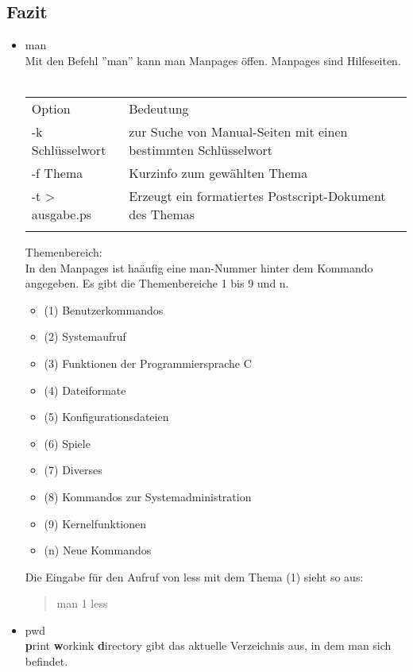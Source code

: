 	\subsection{Fazit}
		\begin{itemize}
			\item man\\
			Mit den Befehl ''man'' kann man Manpages \"offen. Manpages sind Hilfeseiten.\\ \\
			\begin{tabular}{ll}
				Option & Bedeutung \\
				-k Schl\"usselwort & zur Suche von Manual-Seiten mit einen bestimmten Schl\"usselwort \\
				-f Thema & Kurzinfo zum gew\"ahlten Thema \\
				-t > ausgabe.ps & Erzeugt ein formatiertes Postscript-Dokument des Themas\\ \\
			\end{tabular}
			Themenbereich:\\
			In den Manpages ist ha\"aufig eine man-Nummer hinter dem Kommando angegeben. Es gibt die Themenbereiche 1 bis 9 und n.
			\begin{itemize}
				\item (1) Benutzerkommandos
				\item (2) Systemaufruf
				\item (3) Funktionen der Programmiersprache C
				\item (4) Dateiformate
				\item (5) Konfigurationsdateien
				\item (6) Spiele
				\item (7) Diverses
				\item (8) Kommandos zur Systemadministration
				\item (9) Kernelfunktionen
				\item (n) Neue Kommandos
			\end{itemize}
			Die Eingabe f\"ur den Aufruf von less mit dem Thema (1) sieht so aus: \begin{quote}
				man 1 less
			\end{quote}
			\item pwd\\
			\textbf{p}rint \textbf{w}orkink \textbf{d}irectory gibt das aktuelle Verzeichnis aus, in dem man sich befindet.\\ \\
			\begin{tabular}{ll}

\end{tabular}
\end{itemize}
